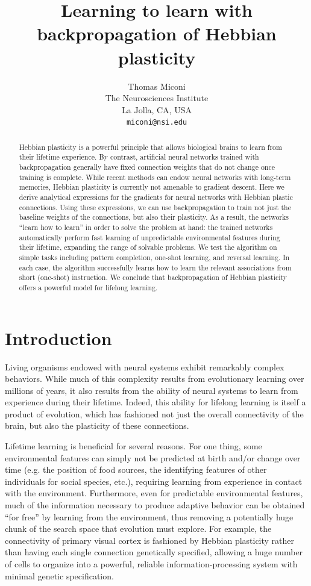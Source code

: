 \documentclass{article}
\title{Learning to learn with backpropagation of Hebbian plasticity}
\author{
    Thomas Miconi\\
    The Neurosciences Institute\\
    La Jolla, CA, USA\\
    \texttt{miconi@nsi.edu}
}
\begin{document}
\maketitle

\begin{abstract}
    Hebbian plasticity is a powerful principle that allows biological brains to
    learn from their lifetime experience.  By contrast, artificial neural
    networks trained with backpropagation generally have fixed connection
    weights that do not change once training is complete.  While recent methods
    can endow neural networks with long-term memories, Hebbian plasticity is
    currently not amenable to gradient descent. Here we derive analytical
    expressions for the
    gradients for neural networks with Hebbian plastic connections. Using these
    expressions, we can use backpropagation to train not just the baseline
    weights of the connections, but also their plasticity. As a result, the
    networks ``learn how to learn''  in order to solve the problem at hand: the
    trained networks automatically perform fast learning of unpredictable environmental
    features during their lifetime, expanding the range of solvable problems. We
    test the algorithm on simple tasks including pattern completion, one-shot learning, and reversal learning. In each case,
     the algorithm successfully learns how to learn the relevant
    associations from short (one-shot) instruction. We conclude
    that backpropagation of Hebbian plasticity offers a powerful model for
    lifelong learning.
\end{abstract}


\section{Introduction}

Living organisms endowed with neural systems exhibit remarkably complex behaviors.
While much of this complexity results from evolutionary learning over millions
of years, it also results from the ability of neural systems to learn from
experience during their lifetime. Indeed, this ability for lifelong learning is
itself a product of evolution, which has fashioned not just the overall
connectivity of the brain, but also the plasticity of these connections. 

Lifetime learning is beneficial for several reasons. For one thing,
some environmental features can simply not be predicted at birth and/or change
over time (e.g. the
position of food sources, the identifying features of other individuals for
social species, etc.), requiring learning from experience in contact with the
environment. Furthermore, even for predictable environmental features, much of
the information necessary to produce adaptive behavior can be obtained ``for
free'' by learning from the environment, thus removing a potentially huge chunk
of the search space that evolution must explore. For example, the connectivity
of primary visual cortex is fashioned by Hebbian plasticity rather than having
each single connection genetically specified, allowing a huge number of cells
to organize into a powerful, reliable information-processing system with
minimal genetic specification.
\end{document}

